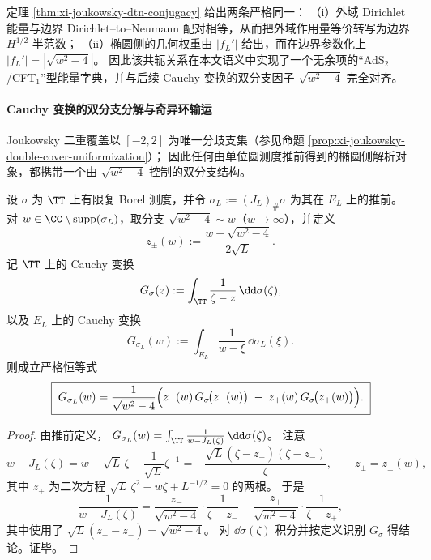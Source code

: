\begin{remark}\label{rem:xi-joukowsky-dtn-ads2cft1-dictionary}
定理 \ref{thm:xi-joukowsky-dtn-conjugacy} 给出两条严格同一：
（i）外域 Dirichlet 能量与边界 Dirichlet--to--Neumann 配对相等，从而把外域作用量等价转写为边界 \(H^{1/2}\) 半范数；
（ii）椭圆侧的几何权重由 \(|f_L'|\) 给出，而在边界参数化上 \(|f_L'|=|\sqrt{w^2-4}|\)。
因此该共轭关系在本文语义中实现了一个无余项的“AdS\(_2\)/CFT\(_1\)”型能量字典，并与后续 Cauchy 变换的双分支因子 \(\sqrt{w^2-4}\) 完全对齐。
\end{remark}

\paragraph{Cauchy 变换的双分支分解与奇异环输运}
Joukowsky 二重覆盖以 \([-2,2]\) 为唯一分歧支集（参见命题 \ref{prop:xi-joukowsky-double-cover-uniformization}）；
因此任何由单位圆测度推前得到的椭圆侧解析对象，都携带一个由 \(\sqrt{w^2-4}\) 控制的双分支结构。

\begin{theorem}\label{thm:xi-joukowsky-cauchy-transform-two-branch}
设 \(\sigma\) 为 \(\TT\) 上有限复 Borel 测度，并令 \(\sigma_L:=(J_L)_\#\sigma\) 为其在 \(E_L\) 上的推前。
对 \(w\in\CC\setminus\mathrm{supp}(\sigma_L)\)，取分支 \(\sqrt{w^2-4}\sim w\)（\(w\to\infty\)），并定义
\[
z_\pm(w):=\frac{w\pm\sqrt{w^2-4}}{2\sqrt{L}}.
\]
记 \(\TT\) 上的 Cauchy 变换
\[
G_\sigma(z):=\int_{\TT}\frac{1}{\zeta-z}\,\dd\sigma(\zeta),
\]
以及 \(E_L\) 上的 Cauchy 变换
\[
G_{\sigma_L}(w):=\int_{E_L}\frac{1}{w-\xi}\,\dd\sigma_L(\xi).
\]
则成立严格恒等式
\[
\boxed{\;
G_{\sigma_L}(w)=\frac{1}{\sqrt{w^2-4}}
\Bigl(
z_-(w)\,G_\sigma\!\bigl(z_-(w)\bigr)\;-\;z_+(w)\,G_\sigma\!\bigl(z_+(w)\bigr)
\Bigr).\;}
\]
\end{theorem}

\begin{proof}
由推前定义，
\(
G_{\sigma_L}(w)=\int_{\TT}\frac{1}{w-J_L(\zeta)}\,\dd\sigma(\zeta)
\)。
注意
\[
w-J_L(\zeta)=w-\sqrt{L}\,\zeta-\frac{1}{\sqrt{L}}\zeta^{-1}
=-\frac{\sqrt{L}(\zeta-z_+)(\zeta-z_-)}{\zeta},
\qquad
z_\pm=z_\pm(w),
\]
其中 \(z_\pm\) 为二次方程 \(\sqrt{L}\,\zeta^2-w\zeta+L^{-1/2}=0\) 的两根。
于是
\[
\frac{1}{w-J_L(\zeta)}
=\frac{z_-}{\sqrt{w^2-4}}\cdot\frac{1}{\zeta-z_-}-\frac{z_+}{\sqrt{w^2-4}}\cdot\frac{1}{\zeta-z_+},
\]
其中使用了 \(\sqrt{L}(z_+-z_-)=\sqrt{w^2-4}\)。
对 \(\dd\sigma(\zeta)\) 积分并按定义识别 \(G_\sigma\) 得结论。证毕。
\end{proof}

